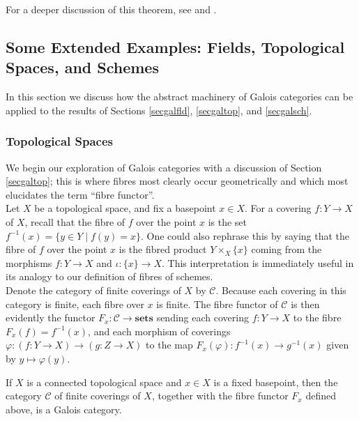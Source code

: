 \documentclass[11pt,openany]{book} %
\begin{document}
For a deeper discussion of this theorem, see \cite{lenstra} and \cite{szamuely}. 


\subsection{Some Extended Examples: Fields, Topological Spaces, and Schemes}

In this section we discuss how the abstract machinery of Galois categories can be applied to the results of Sections \ref{secgalfld}, \ref{secgaltop}, and \ref{secgalsch}.

\subsubsection{Topological Spaces}

We begin our exploration of Galois categories with a discussion of Section \ref{secgaltop}; this is where fibres most clearly occur geometrically and which most elucidates the term ``fibre functor''. \\

Let $X$ be a topological space, and fix a basepoint $x \in X$. For a covering $f : Y \to X$ of $X$, recall that the fibre of $f$ over the point $x$ is the set $f^{-1}(x) = \{y \in Y \mid f(y) = x\}$. One could also rephrase this by saying that the fibre of $f$ over the point $x$ is the fibred product $Y \times_X \{x\}$ coming from the morphisms $f : Y \to X$ and $\iota: \{x\} \to X$. This interpretation is immediately useful in its analogy to our definition of fibres of schemes.\\

Denote the category of finite coverings of $X$ by $\mathcal{C}$. Because each covering in this category is finite, each fibre over $x$ is finite. The fibre functor of $\mathcal{C}$ is then evidently the functor $F_x : \mathcal{C} \to \mathbf{sets}$ sending each covering $f : Y \to X$ to the fibre $F_x(f) = f^{-1}(x)$, and each morphism of coverings $\varphi : (f : Y \to X) \to (g: Z \to X)$ to the map $F_x(\varphi) : f^{-1}(x) \to g^{-1}(x)$ given by $y \mapsto \varphi(y)$.\\

\begin{theorem}
If $X$ is a connected topological space and $x \in X$ is a fixed basepoint, then the category $\mathcal{C}$ of finite coverings of $X$, together with the fibre functor $F_x$ defined above, is a Galois category.
\end{theorem}
\end{document}
